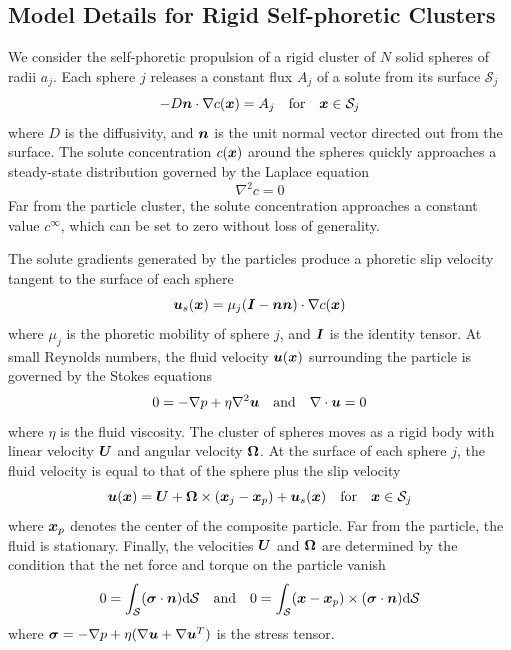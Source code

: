 \begin{appendices}
\section{Model Details for Rigid Self-phoretic Clusters}

We consider the self-phoretic propulsion of a rigid cluster of $N$ solid spheres of radii $a_j$. Each sphere $j$ releases a constant flux $A_j$ of a solute from its surface $\mathcal{S}_j$  
\begin{equation}
    -D \boldsymbol{n}\cdot \nabla c(\boldsymbol{x}) = A_j \quad \text{for} \quad \boldsymbol{x} \in \mathcal{S}_j \label{eq:bc1}
\end{equation}
where $D$ is the diffusivity, and $\boldsymbol{n}$ is the unit normal vector directed out from the surface.  The solute concentration $c(\boldsymbol{x})$ around the spheres quickly approaches a steady-state distribution governed by the Laplace equation
\begin{equation}
    \nabla^2 c = 0
\end{equation}
Far from the particle cluster, the solute concentration approaches a constant value $c^{\infty}$, which can be set to zero without loss of generality. 

The solute gradients generated by the particles produce a phoretic slip velocity tangent to the surface of each sphere 
\begin{equation}
    \boldsymbol{u}_s(\boldsymbol{x}) = \mu_j (\boldsymbol{I}-\boldsymbol{n}\boldsymbol{n}) \cdot \nabla c(\boldsymbol{x}) 
\end{equation}
where $\mu_j$ is the phoretic mobility of sphere $j$, and $\boldsymbol{I}$ is the identity tensor. At small Reynolds numbers, the fluid velocity $\boldsymbol{u}(\boldsymbol{x})$ surrounding the particle is governed by the Stokes equations
\begin{equation}
    0 = -\nabla p + \eta \nabla^2 \boldsymbol{u} \quad \text{and}\quad \nabla\cdot\boldsymbol{u} = 0
\end{equation}
where $\eta$ is the fluid viscosity.  The cluster of spheres moves as a rigid body with linear velocity $\boldsymbol{U}$ and angular velocity $\boldsymbol{\Omega}$.  At the surface of each sphere $j$, the fluid velocity is equal to that of the sphere plus the slip velocity  
\begin{equation}
    \boldsymbol{u}(\boldsymbol{x}) = \boldsymbol{U} + \boldsymbol{\Omega}\times(\boldsymbol{x}_j - \boldsymbol{x}_p) + \boldsymbol{u}_s(\boldsymbol{x}) \quad \text{for} \quad \boldsymbol{x} \in \mathcal{S}_j
\end{equation}
where $\boldsymbol{x}_p$ denotes the center of the composite particle.  Far from the particle, the fluid is stationary.  Finally, the velocities $\boldsymbol{U}$ and $\boldsymbol{\Omega}$ are determined by the condition that the net force and torque on the particle vanish
\begin{equation}
    0 = \int_{\mathcal{S}} (\boldsymbol{\sigma}\cdot\boldsymbol{n}) \mathrm{d}\mathcal{S}  \quad \text{and} \quad 0 = \int_{\mathcal{S}} (\boldsymbol{x}-\boldsymbol{x}_p)\times (\boldsymbol{\sigma}\cdot\boldsymbol{n} )\mathrm{d}\mathcal{S}  \label{eq:noForceTorque}
\end{equation}
where $\boldsymbol{\sigma} = -\nabla p + \eta(\nabla\boldsymbol{u}+\nabla\boldsymbol{u}^T)$ is the stress tensor.


\end{appendices}
